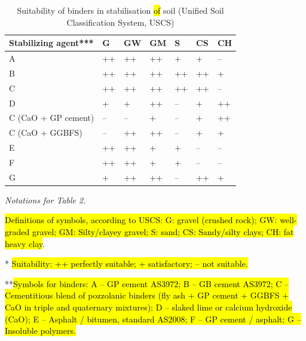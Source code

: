 \documentclass[electronics,article,submit,pdftex,moreauthors]{Definitions/mdpi}
\begin{document}
\begin{table}[H]
\begin{threeparttable}
\caption{Suitability of binders in\hl{ }stabilisation\hl{ of }soil (Unified Soil Classification System, USCS)}
\small
    \begin{tabularx}{\textwidth}{|l|l|l|l|l|l|l|}
    \toprule
        \textbf{Stabilizing agent***} & \textbf{G} & \textbf{GW} & \textbf{GM} & \textbf{S} & \textbf{CS} & \textbf{CH} \\ \midrule
        A & ++ & ++ & ++ & + & + & – \\ \hline
        B & ++ & ++ & ++ & ++ & ++ & + \\ \hline
        C & ++ & ++ & ++ & ++ & ++ & – \\ \hline
        D & + & + & ++ & – & + & ++ \\ \hline
        C (CaO + GP cement) & – & – & + & – & + & ++ \\ \hline
        C (CaO + GGBFS) & – & ++ & ++ & – & + & + \\ \hline
        E & ++ & ++ & + & + & – & – \\ \hline
        F & ++ & ++ & + & + & – & – \\ \hline
        G & + & ++ & ++ & – & ++ & + \\
\bottomrule
    \end{tabularx} \label{tab:2}
        \begin{tablenotes}
      \scriptsize
      	\item \emph{Notations for Table 2.} 
	\item * \hl{Definitions of symbols, according to USCS: G: gravel (crushed rock); GW: well-graded gravel; GM: Silty/clayey gravel; S: sand; CS: Sandy/silty clays; CH: fat heavy clay}.
	\item ** \hl{Suitability: ++ perfectly suitable; + satisfactory; -- not suitable.}
	\item ***\hl{Symbols for binders: A -- GP cement AS3972; B -- GB cement AS3972; C -- Cementitious blend of pozzolanic binders (fly ash + GP cement + GGBFS + CaO in triple and quaternary mixtures); D -- slaked lime or calcium hydroxide (CaO); E -- Asphalt / bitumen, standard AS2008; F -- GP cement / asphalt; G -- Insoluble polymers.}
    \end{tablenotes}
  \end{threeparttable}
\end{table}
\end{document}
